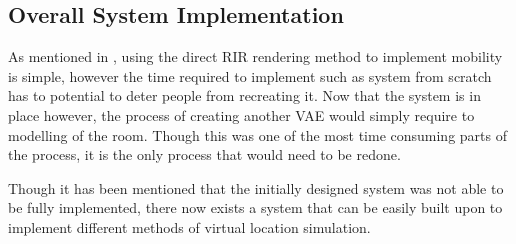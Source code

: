 \documentclass[../../main.tex]{subfiles}
\begin{document}








		\subsection{Overall System Implementation}
			 As mentioned in , using the direct \ac{RIR} rendering method to implement mobility is simple, however the time required to implement such as system from scratch has to potential to deter people from recreating it. Now that the system is in place however, the process of creating another \ac{VAE} would simply require to modelling of the room. Though this was one of the most time consuming parts of the process, it is the only process that would need to be redone.

			Though it has been mentioned that the initially designed system was not able to be fully implemented, there now exists a system that can be easily built upon to implement different methods of virtual location simulation.
\end{document}
